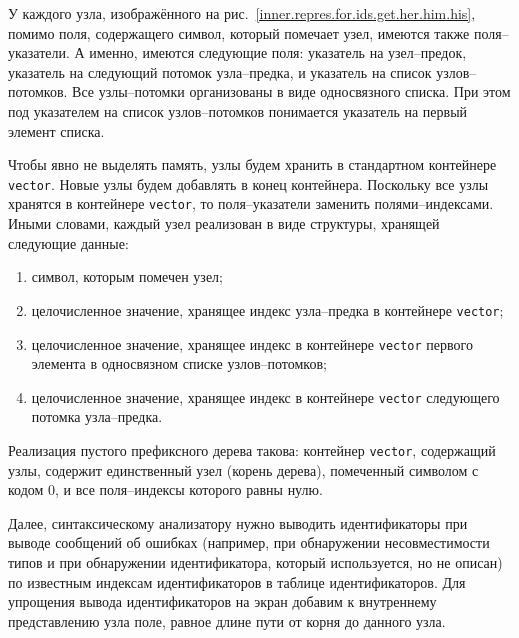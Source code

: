 \documentclass[10pt]{report}
\begin{document}
У каждого узла, изображённого на рис.~\ref{inner.repres.for.ids.get.her.him.his}, помимо поля, содержащего символ, который помечает узел, имеются также поля--указатели. А именно, имеются следующие поля: указатель на узел--предок, указатель на следующий потомок узла--предка, и указатель на список узлов--потомков. Все узлы--потомки организованы в виде односвязного списка. При этом под указателем на список узлов--потомков понимается указатель на первый элемент списка.

Чтобы явно не выделять память, узлы будем хранить в стандартном контейнере \texttt{vector}. Новые узлы будем добавлять в конец контейнера. Поскольку все узлы хранятся в контейнере \texttt{vector}, то поля--указатели заменить полями--индексами. Иными словами, каждый узел реализован в виде структуры, хранящей следующие данные:
\begin{enumerate}
\item символ, которым помечен узел;
\item целочисленное значение, хранящее индекс узла--предка в контейнере \texttt{vector};
\item целочисленное значение, хранящее индекс в контейнере \texttt{vector} первого элемента в односвязном списке узлов--потомков;
\item целочисленное значение, хранящее индекс в контейнере \texttt{vector} следующего потомка узла--предка.
\end{enumerate}

Реализация пустого префиксного дерева такова: контейнер \texttt{vector}, содержащий узлы, содержит единственный узел (корень дерева), помеченный символом с кодом 0, и все поля--индексы которого равны нулю.

Далее, синтаксическому анализатору нужно выводить идентификаторы при выводе сообщений об ошибках (например, при обнаружении несовместимости типов и при обнаружении идентификатора, который используется, но не описан) по известным индексам идентификаторов в таблице идентификаторов. Для упрощения вывода идентификаторов на экран добавим к внутреннему представлению узла поле, равное длине пути от корня до данного узла.
\end{document}
